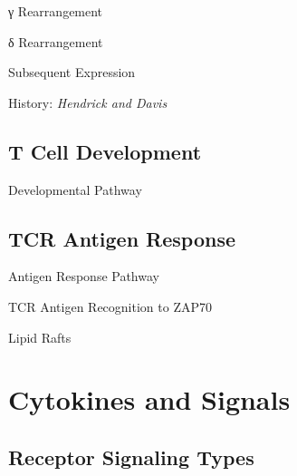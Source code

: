 \documentclass[10pt]{article}
\begin{document}
      \begin{core}{γ Rearrangement}

      \end{core}

      \begin{core}{δ Rearrangement}

      \end{core}

      \begin{core}{Subsequent Expression}

      \end{core}

      \begin{core}{History: \textit{Hendrick and Davis}}

      \end{core}

  \subsection{T Cell Development}

    \begin{core}{Developmental Pathway}

    \end{core}

  \subsection{TCR Antigen Response}

    \begin{core}{Antigen Response Pathway}

    \end{core}

    \begin{core}{TCR Antigen Recognition to ZAP70}

    \end{core}

    \begin{core}{Lipid Rafts}

    \end{core}
  
\section{Cytokines and Signals}

  \subsection{Receptor Signaling Types}
\end{document}
